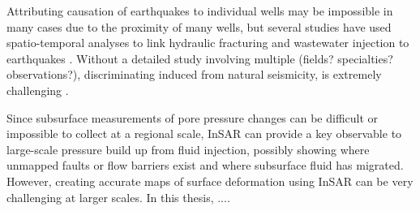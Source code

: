 

Attributing causation of earthquakes to individual wells may be impossible in many cases due to the proximity of many wells, but several studies have used spatio-temporal analyses to link hydraulic fracturing and wastewater injection to earthquakes \citep{Savvaidis2020InducedSeismicityDelaware, Skoumal2020InducedSeismicityDelaware, Grigoratos2020EarthquakesInducedWastewatera}.
Without a detailed study involving multiple (fields? specialties? observations?), discriminating induced from natural seismicity, is extremely challenging \citep{Grigoli2017CurrentChallengesMonitoring, Dahm2012RecommendationDiscriminationHuman, Verdon2019ImprovedFrameworkDiscriminating,Frohlich2016HistoricalReviewInduced, Frohlich2016ReplyCommentA}.


Since subsurface measurements of pore pressure changes can be difficult or impossible to collect at a regional scale, InSAR can provide a key observable to large-scale pressure build up from fluid injection, possibly showing where unmapped faults or flow barriers exist and where subsurface fluid has migrated.
However, creating accurate maps of surface deformation using InSAR can be very challenging at larger scales. 
In this thesis, ....








